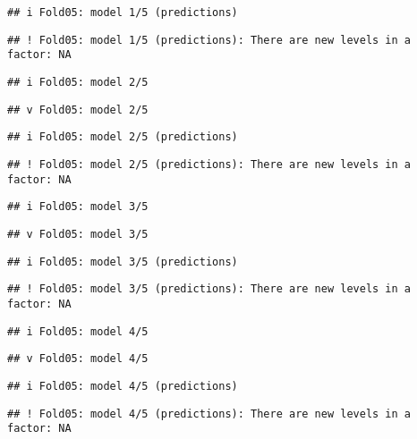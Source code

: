 \documentclass[
]{article}
\begin{document}
\begin{verbatim}
## i Fold05: model 1/5 (predictions)
\end{verbatim}

\begin{verbatim}
## ! Fold05: model 1/5 (predictions): There are new levels in a factor: NA
\end{verbatim}

\begin{verbatim}
## i Fold05: model 2/5
\end{verbatim}

\begin{verbatim}
## v Fold05: model 2/5
\end{verbatim}

\begin{verbatim}
## i Fold05: model 2/5 (predictions)
\end{verbatim}

\begin{verbatim}
## ! Fold05: model 2/5 (predictions): There are new levels in a factor: NA
\end{verbatim}

\begin{verbatim}
## i Fold05: model 3/5
\end{verbatim}

\begin{verbatim}
## v Fold05: model 3/5
\end{verbatim}

\begin{verbatim}
## i Fold05: model 3/5 (predictions)
\end{verbatim}

\begin{verbatim}
## ! Fold05: model 3/5 (predictions): There are new levels in a factor: NA
\end{verbatim}

\begin{verbatim}
## i Fold05: model 4/5
\end{verbatim}

\begin{verbatim}
## v Fold05: model 4/5
\end{verbatim}

\begin{verbatim}
## i Fold05: model 4/5 (predictions)
\end{verbatim}

\begin{verbatim}
## ! Fold05: model 4/5 (predictions): There are new levels in a factor: NA
\end{verbatim}
\end{document}

